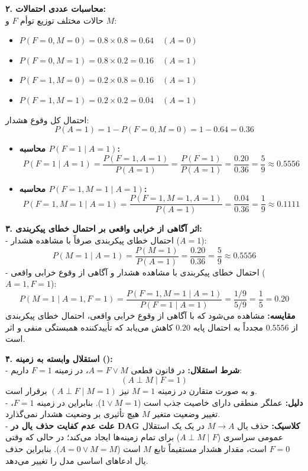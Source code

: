 \textbf{۲. محاسبات عددی احتمالات:} \\
حالات مختلف توزیع توأم $F$ و $M$:
\begin{itemize}
  \item $P(F=0, M=0) = 0.8 \times 0.8 = 0.64 \quad (A=0)$
  \item $P(F=0, M=1) = 0.8 \times 0.2 = 0.16 \quad (A=1)$
  \item $P(F=1, M=0) = 0.2 \times 0.8 = 0.16 \quad (A=1)$
  \item $P(F=1, M=1) = 0.2 \times 0.2 = 0.04 \quad (A=1)$
\end{itemize}
احتمال کل وقوع هشدار:
\[
  P(A=1) = 1 - P(F=0, M=0) = 1 - 0.64 = 0.36
\]
\begin{itemize}
  \item \textbf{محاسبه $P(F=1 \mid A=1)$:}
  \[
    P(F=1 \mid A=1) = \frac{P(F=1, A=1)}{P(A=1)} = \frac{P(F=1)}{P(A=1)} = \frac{0.20}{0.36} = \frac{5}{9} \approx 0.5556
  \]
  \item \textbf{محاسبه $P(F=1, M=1 \mid A=1)$:}
  \[
    P(F=1, M=1 \mid A=1) = \frac{P(F=1, M=1, A=1)}{P(A=1)} = \frac{0.04}{0.36} = \frac{1}{9} \approx 0.1111
  \]
\end{itemize}

\textbf{۳. اثر آگاهی از خرابی واقعی بر احتمال خطای پیکربندی:} \\
- احتمال خطای پیکربندی صرفاً با مشاهده هشدار ($A=1$):
\[
  P(M=1 \mid A=1) = \frac{P(M=1)}{P(A=1)} = \frac{0.20}{0.36} = \frac{5}{9} \approx 0.5556
\]
- احتمال خطای پیکربندی با مشاهده هشدار و آگاهی از وقوع خرابی واقعی ($A=1, F=1$):
\[
  P(M=1 \mid A=1, F=1) = \frac{P(F=1, M=1 \mid A=1)}{P(F=1 \mid A=1)} = \frac{1/9}{5/9} = \frac{1}{5} = 0.20
\]
\textbf{مقایسه:} مشاهده می‌شود که با آگاهی از وقوع خرابی واقعی، احتمال خطای پیکربندی از $0.5556$ مجدداً به احتمال پایه $0.20$ کاهش می‌یابد که تأییدکننده همبستگی منفی و اثر  است.

\textbf{۴. استقلال وابسته به زمینه ():} \\
- \textbf{شرط استقلال:} در قانون قطعی $A = F \lor M$، در زمینه $F=1$ داریم:
\[
  (A \perp M \mid F=1)
\]
و به صورت متقارن در زمینه $M=1$ نیز $(A \perp F \mid M=1)$ برقرار است. \\
- \textbf{دلیل:} عملگر منطقی  دارای خاصیت جذب است ($1 \lor M = 1$). بنابراین در زمینه $F=1$، تغییر وضعیت متغیر $M$ هیچ تأثیری بر وضعیت هشدار نمی‌گذارد. \\
- \textbf{علت عدم کفایت حذف یال در DAG کلاسیک:} حذف یال $M \to A$ در یک  یک استقلال عمومی سراسری ($A \perp M \mid F$) برای تمام زمینه‌ها ایجاد می‌کند؛ در حالی که وقتی $F=0$ است، مقدار هشدار مستقیماً تابع $M$ است ($A = 0 \lor M = M$). بنابراین حذف یال ادعاهای اساسی مدل را تغییر می‌دهد.


